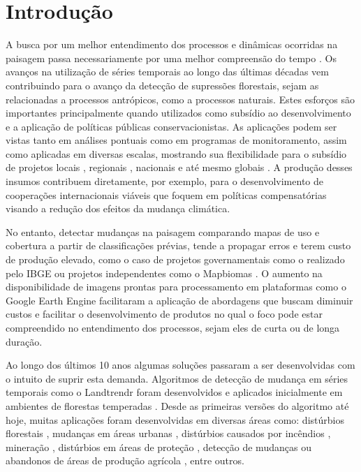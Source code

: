 \section*{Introdução}
\hspace{13pt} A busca por um melhor entendimento dos processos e dinâmicas ocorridas na paisagem passa necessariamente por uma melhor compreensão do tempo \citep{gregory85}. 
Os avanços na utilização de séries temporais ao longo das últimas décadas vem contribuindo para o avanço da detecção de supressões florestais, sejam as relacionadas a processos antrópicos, como a processos naturais. Estes esforços são importantes principalmente
quando utilizados como subsídio ao desenvolvimento e a aplicação de políticas públicas conservacionistas. As aplicações podem ser vistas tanto em análises pontuais como em programas de monitoramento, assim como aplicadas em diversas escalas, mostrando sua flexibilidade para o subsídio de projetos locais \citep{rs12111815}, regionais \citep{Vancutsemeabe1603, silva_junior_brazilian_2021, brandt_unexpectedly_2020}, nacionais \citep{rs12111790} e até mesmo globais \citep{Hansen850, crowther_mapping_2015, POTAPOV2021112165}. A produção desses insumos contribuem diretamente, por exemplo, para o desenvolvimento de cooperações internacionais viáveis que foquem em políticas compensatórias visando a redução dos efeitos da mudança climática. 

No entanto, detectar mudanças na paisagem comparando mapas de uso e cobertura a partir de classificações prévias, tende a propagar erros e terem custo de produção elevado, como o caso de projetos governamentais como o realizado pelo IBGE \citep{ibge2020} ou projetos independentes como o Mapbiomas \citep{Souza2019}. O aumento na disponibilidade de imagens prontas para processamento  \citep{rs12030426} em plataformas como o Google Earth Engine facilitaram a aplicação de abordagens que buscam diminuir custos e facilitar o desenvolvimento de produtos no qual o foco pode estar compreendido no entendimento dos processos, sejam eles de curta ou de longa duração.

Ao longo dos últimos 10 anos algumas soluções passaram a ser desenvolvidas com o intuito de suprir esta demanda. Algoritmos de detecção de mudança em séries temporais como o Landtrendr foram desenvolvidos e aplicados inicialmente em ambientes de florestas temperadas \citep{KENNEDY2012117}. Desde as primeiras versões do algoritmo até hoje, muitas aplicações foram desenvolvidas em diversas áreas como: distúrbios florestais \citep{rs9050479, rs12223720}, mudanças em áreas urbanas \citep{rs12182883, rs13132438}, distúrbios causados por incêndios \citep{rs12091499, rs12233942}, mineração \citep{rs12101612, rs12142235}, distúrbios em áreas de proteção \citep{rs13091800}, detecção de mudanças ou abandonos de áreas de produção agrícola \citep{YIN201812, rs11101234, KOLECKA2021112340, DARA201849}, entre outros.

